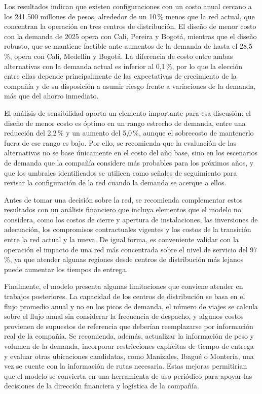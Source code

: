\documentclass[fleqn, 11pt,letterpaper]{article}
\begin{document}
Los resultados indican que existen configuraciones con un costo anual cercano a los 241.500 millones de pesos, alrededor de un 10\,\% menos que la red actual, que concentran la operación en tres centros de distribución. El diseño de menor costo con la demanda de 2025 opera con Cali, Pereira y Bogotá, mientras que el diseño robusto, que se mantiene factible ante aumentos de la demanda de hasta el 28,5\,\%, opera con Cali, Medellín y Bogotá. La diferencia de costo entre ambas alternativas con la demanda actual es inferior al 0,1\,\%, por lo que la elección entre ellas depende principalmente de las expectativas de crecimiento de la compañía y de su disposición a asumir riesgo frente a variaciones de la demanda, más que del ahorro inmediato.

El análisis de sensibilidad aporta un elemento importante para esa discusión: el diseño de menor costo es óptimo en un rango estrecho de demanda, entre una reducción del 2,2\,\% y un aumento del 5,0\,\%, aunque el sobrecosto de mantenerlo fuera de ese rango es bajo. Por ello, se recomienda que la evaluación de las alternativas no se base únicamente en el costo del año base, sino en los escenarios de demanda que la compañía considere más probables para los próximos años, y que los umbrales identificados se utilicen como señales de seguimiento para revisar la configuración de la red cuando la demanda se acerque a ellos.

Antes de tomar una decisión sobre la red, se recomienda complementar estos resultados con un análisis financiero que incluya elementos que el modelo no considera, como los costos de cierre y apertura de instalaciones, las inversiones de adecuación, los compromisos contractuales vigentes y los costos de la transición entre la red actual y la nueva. De igual forma, es conveniente validar con la operación el impacto de una red más concentrada sobre el nivel de servicio del 97\,\%, ya que atender algunas regiones desde centros de distribución más lejanos puede aumentar los tiempos de entrega.

Finalmente, el modelo presenta algunas limitaciones que conviene atender en trabajos posteriores. La capacidad de los centros de distribución se basa en el flujo promedio anual y no en los picos de demanda, el número de viajes se calcula sobre el flujo anual sin considerar la frecuencia de despacho, y algunos costos provienen de supuestos de referencia que deberían reemplazarse por información real de la compañía. Se recomienda, además, actualizar la información de peso y volumen de la demanda, incorporar restricciones explícitas de tiempo de entrega y evaluar otras ubicaciones candidatas, como Manizales, Ibagué o Montería, una vez se cuente con la información de rutas necesaria. Estas mejoras permitirían que el modelo se convierta en una herramienta de uso periódico para apoyar las decisiones de la dirección financiera y logística de la compañía.


\renewcommand{\refname}{Referencias}


\end{document}
